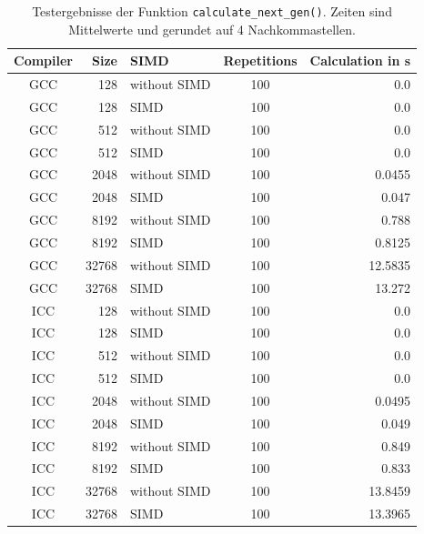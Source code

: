\documentclass[german,plainarticle,hyperref,utf8]{zihpub}
\begin{document}
	\begin{table}
		\begin{center}
			\begin{tabular}{|| c r l c r ||}
				\hline
				Compiler & Size  & SIMD & Repetitions & Calculation in s \\ [1ex]
				\hline\hline
				GCC & 128 & without SIMD & 100 & 0.0 \\ \hline
				GCC & 128 & SIMD & 100 & 0.0 \\ \hline
				GCC & 512 & without SIMD & 100 & 0.0 \\ \hline
				GCC & 512 & SIMD & 100 & 0.0 \\ \hline
				GCC & 2048 & without SIMD & 100 & 0.0455 \\ \hline
				GCC & 2048 & SIMD & 100 & 0.047 \\ \hline
				GCC & 8192 & without SIMD & 100 & 0.788 \\ \hline
				GCC & 8192 & SIMD & 100 & 0.8125 \\ \hline
				GCC & 32768 & without SIMD & 100 & 12.5835 \\ \hline \hline
				GCC & 32768 & SIMD & 100 & 13.272 \\ \hline
				ICC & 128 & without SIMD & 100 & 0.0 \\ \hline
				ICC & 128 & SIMD & 100 & 0.0 \\ \hline
				ICC & 512 & without SIMD & 100 & 0.0 \\ \hline
				ICC & 512 & SIMD & 100 & 0.0 \\ \hline
				ICC & 2048 & without SIMD & 100 & 0.0495 \\ \hline
				ICC & 2048 & SIMD & 100 & 0.049 \\ \hline
				ICC & 8192 & without SIMD & 100 & 0.849 \\ \hline
				ICC & 8192 & SIMD & 100 & 0.833 \\ \hline
				ICC & 32768 & without SIMD & 100 & 13.8459 \\ \hline
				ICC & 32768 & SIMD & 100 & 13.3965 \\ \hline
			\end{tabular}
			\caption{\label{tab:calc}Testergebnisse der Funktion \texttt{calculate\_next\_gen()}. Zeiten sind Mittelwerte und gerundet auf 4 Nachkommastellen.}
		\end{center}
	\end{table}
	\clearpage
	
\end{document}
